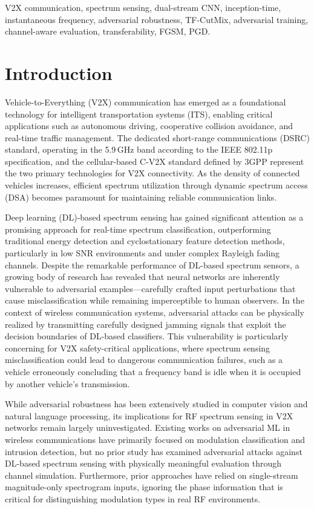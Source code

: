 \documentclass[conference]{IEEEtran}
\begin{document}
\begin{IEEEkeywords}
V2X communication, spectrum sensing, dual-stream CNN, inception-time, instantaneous frequency, adversarial robustness, TF-CutMix, adversarial training, channel-aware evaluation, transferability, FGSM, PGD.
\end{IEEEkeywords}

\section{Introduction}
\label{sec:intro}

Vehicle-to-Everything (V2X) communication has emerged as a foundational technology for intelligent transportation systems (ITS), enabling critical applications such as autonomous driving, cooperative collision avoidance, and real-time traffic management. The dedicated short-range communications (DSRC) standard, operating in the 5.9\,GHz band according to the IEEE 802.11p specification, and the cellular-based C-V2X standard defined by 3GPP represent the two primary technologies for V2X connectivity. As the density of connected vehicles increases, efficient spectrum utilization through dynamic spectrum access (DSA) becomes paramount for maintaining reliable communication links.

Deep learning (DL)-based spectrum sensing has gained significant attention as a promising approach for real-time spectrum classification, outperforming traditional energy detection and cyclostationary feature detection methods, particularly in low SNR environments and under complex Rayleigh fading channels. Despite the remarkable performance of DL-based spectrum sensors, a growing body of research has revealed that neural networks are inherently vulnerable to adversarial examples---carefully crafted input perturbations that cause misclassification while remaining imperceptible to human observers. In the context of wireless communication systems, adversarial attacks can be physically realized by transmitting carefully designed jamming signals that exploit the decision boundaries of DL-based classifiers. This vulnerability is particularly concerning for V2X safety-critical applications, where spectrum sensing misclassification could lead to dangerous communication failures, such as a vehicle erroneously concluding that a frequency band is idle when it is occupied by another vehicle's transmission.

While adversarial robustness has been extensively studied in computer vision and natural language processing, its implications for RF spectrum sensing in V2X networks remain largely uninvestigated. Existing works on adversarial ML in wireless communications have primarily focused on modulation classification and intrusion detection, but no prior study has examined adversarial attacks against DL-based spectrum sensing with physically meaningful evaluation through channel simulation. Furthermore, prior approaches have relied on single-stream magnitude-only spectrogram inputs, ignoring the phase information that is critical for distinguishing modulation types in real RF environments.
\end{document}
